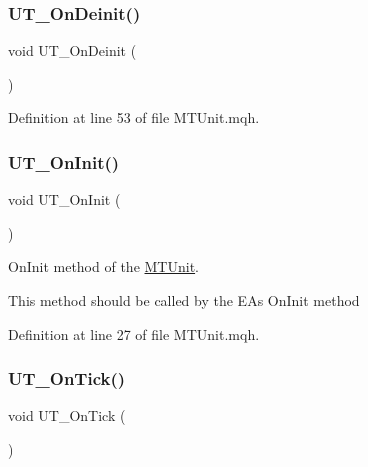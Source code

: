 \mbox{\label{_m_t_unit_8mqh_a9fbaaa20ba4e1624e348f7ab5109ecbf}} 
\subsubsection{\texorpdfstring{U\+T\+\_\+\+On\+Deinit()}{UT\_OnDeinit()}}
{\footnotesize\ttfamily void U\+T\+\_\+\+On\+Deinit (\begin{DoxyParamCaption}{ }\end{DoxyParamCaption})}



Definition at line 53 of file M\+T\+Unit.\+mqh.

\mbox{\label{_m_t_unit_8mqh_a9cdc57544d91884fab6f627b3394326f}} 
\subsubsection{\texorpdfstring{U\+T\+\_\+\+On\+Init()}{UT\_OnInit()}}
{\footnotesize\ttfamily void U\+T\+\_\+\+On\+Init (\begin{DoxyParamCaption}{ }\end{DoxyParamCaption})}



On\+Init method of the \mbox{\hyperlink{class_m_t_unit}{M\+T\+Unit}}. 

This method should be called by the EA\textquotesingle{}s On\+Init method 

Definition at line 27 of file M\+T\+Unit.\+mqh.

\mbox{\label{_m_t_unit_8mqh_afcdc18c227067029c1bb10f935bdb21c}} 
\subsubsection{\texorpdfstring{U\+T\+\_\+\+On\+Tick()}{UT\_OnTick()}}
{\footnotesize\ttfamily void U\+T\+\_\+\+On\+Tick (\begin{DoxyParamCaption}{ }\end{DoxyParamCaption})}



